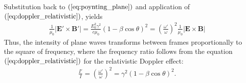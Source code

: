 \documentclass [12pt, a4paper] {article}
\newcommand{\vc}[1]
{
	\boldsymbol{#1}
}
\begin{document}
Substitution back to $(\ref{eq:poynting_plane})$ and application of 
$(\ref{eq:doppler_relativistic})$, yields
\begin {eqnarray}
    \frac{1}{\mu_0}|\vc E'\times\vc B'|
    =
    \frac{E_0^2\gamma^2}{c\mu_0}(1 - \beta\cos\theta)^2
    = 
    \left(\frac{\omega'}{\omega}\right)^2 
    \frac{1}{\mu_0}|\vc E\times\vc B|
\end {eqnarray}
Thus, the intensity of plane waves transforms between frames proportionally to the 
square of frequency, where the frequency ratio follows from the equation 
$(\ref{eq:doppler_relativistic})$ for the relativistic Doppler effect:
\begin {eqnarray}
    \label{eq:intensity_transform}
    \boxed{
    \quad
    \frac{I'}{I}
    =
    \left(
    \frac{\omega'}{\omega}
    \right)^2
    = 
    \gamma^2(1 - \beta\cos\theta)^2
    .
    \quad
    }
\end {eqnarray}
\end{document}
